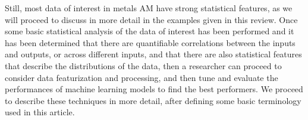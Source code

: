 Still, most data of interest in metals AM have strong statistical features, as we will proceed to discuss in more detail in the examples given in this review. Once some basic statistical analysis of the data of interest has been performed and it has been determined that there are quantifiable correlations between the inputs and outputs, or across different inputs, and that there are also statistical features that describe the distributions of the data, then a researcher can proceed to consider data featurization and processing, and then tune and evaluate the performances of machine learning models to find the best performers. We proceed to describe these techniques in more detail, after defining some basic terminology used in this article.




